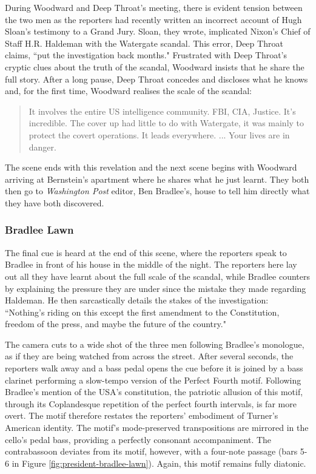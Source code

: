 During Woodward and Deep Throat's meeting, there is evident tension between the two men as the reporters had recently written an incorrect account of Hugh Sloan's testimony to a Grand Jury.
Sloan, they wrote, implicated Nixon's Chief of Staff H.R. Haldeman with the Watergate scandal.
This error, Deep Throat claims, ``put the investigation back months."
Frustrated with Deep Throat's cryptic clues about the truth of the scandal, Woodward insists that he share the full story.
After a long pause, Deep Throat concedes and discloses what he knows and, for the first time, Woodward realises the scale of the scandal:
\begin{quote}
It involves the entire US intelligence community. FBI, CIA, Justice. It's incredible. The cover up had little to do with Watergate, it was mainly to protect the covert operations. It leads everywhere. ... Your lives are in danger.
\end{quote}
The scene ends with this revelation and the next scene begins with Woodward arriving at Bernstein's apartment where he shares what he just learnt.
They both then go to \textit{Washington Post} editor, Ben Bradlee's, house to tell him directly what they have both discovered.

\subsubsection{Bradlee Lawn}

The final cue is heard at the end of this scene, where the reporters speak to Bradlee in front of his house in the middle of the night.
The reporters here lay out all they have learnt about the full scale of the scandal, while Bradlee counters by explaining the pressure they are under since the mistake they made regarding Haldeman.
He then sarcastically details the stakes of the investigation:
``Nothing's riding on this except the first amendment to the Constitution, freedom of the press, and maybe the future of the country."\autocites[The first amendment of the USA's Constitution declares that ``Congress shall make no law respecting an establishment of religion, or prohibiting the free exercise thereof; or abridging the freedom of speech, or of the press; or the right of the people peaceably to assemble, and to petition the Government for a redress of grievances."][]{noauthor_constitution_nodate}

The camera cuts to a wide shot of the three men following Bradlee's monologue, as if they are being watched from across the street.
After several seconds, the reporters walk away and a bass pedal opens the cue before it is joined by a bass clarinet performing a slow-tempo version of the Perfect Fourth motif.
Following Bradlee's mention of the USA's constitution, the patriotic allusion of this motif, through its Coplandesque repetition of the perfect fourth intervals, is far more overt.
The motif therefore restates the reporters' embodiment of Turner's American identity.
The motif's mode-preserved transpositions are mirrored in the cello's pedal bass, providing a perfectly consonant accompaniment.
The contrabassoon deviates from its motif, however, with a four-note passage (bars 5-6 in Figure \ref{fig:president-bradlee-lawn}).
Again, this motif remains fully diatonic.

